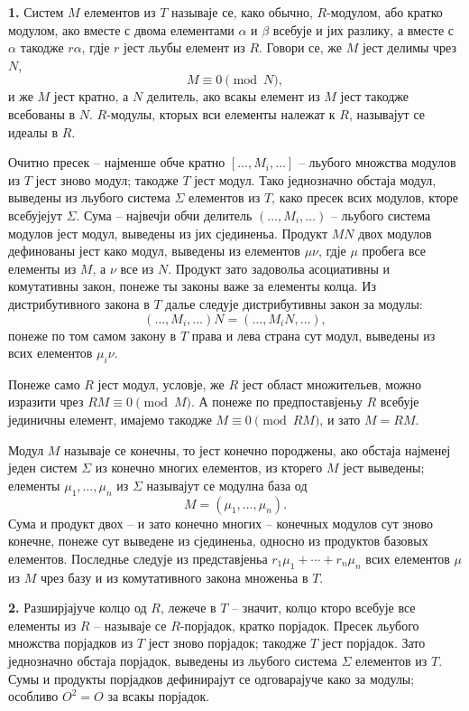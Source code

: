 ﻿\documentclass[11pt]{article}
\begin{document}
\textbf{1.} Систем $M$ елементов из $T$ называје се, како обычно, $R$-модулом, або кратко модулом, ако вместе с двома елементами $\alpha$ и $\beta$ всебује и јих разлику, а вместе с $\alpha$ такодже $r\alpha$, гдје $r$ јест льубы елемент из $R$. Говори се, же $M$ јест делимы чрез $N$,
\[
        M\equiv 0 \pmod N,
\]
и же $M$ јест кратно, а $N$ делитель, ако всакы елемент из $M$ јест такодже всебованы в $N$. $R$-модулы, кторых вси елементы належат к $R$, называјут се идеалы в $R$.

Очитно пресек -- најменше обче кратно $[\ldots,M_i,\ldots]$ -- льубого множства модулов из $T$ јест зново модул; такодже $T$ јест модул. Тако једнозначно обстаја модул, выведены из льубого система $\Sigma$ елементов из $T$, како пресек всих модулов, кторе всебујејут $\Sigma$. Сума -- највечји обчи делитель $(\ldots,M_i,\ldots)$ -- льубого система модулов јест модул, выведены из јих сјединеньа. Продукт $MN$ двох модулов дефинованы јест како модул, выведены из елементов $\mu\nu$, гдје $\mu$ пробега все елементы из $M$, а $\nu$ все из $N$. Продукт зато задовольа асоциативны и комутативны закон, понеже ты законы важе за елементы колца. Из дистрибутивного закона в $T$ далье следује дистрибутивны закон за модулы:
\[
        (\ldots,M_i,\ldots)N=(\ldots,M_iN,\ldots),
\]
понеже по том самом закону в $T$ права и лева страна сут модул, выведены из всих елементов $\mu_i\nu$.

Понеже само $R$ јест модул, условје, же $R$ јест област множительев, можно изразити чрез $RM\equiv0\pmod M$. А понеже по предпоставјеньу $R$ всебује јединичны елемент, имајемо такодже $M\equiv0\pmod{RM}$, и зато $M=RM$.

Модул $M$ называје се конечны, то јест конечно породжены, ако обстаја најменеј једен систем $\Sigma$ из конечно многих елементов, из кторего $M$ јест выведены; елементы $\mu_1,\ldots,\mu_n$ из $\Sigma$ называјут се модулна база од
\[
        M=(\mu_1,\ldots,\mu_n).
\]
Сума и продукт двох -- и зато конечно многих -- конечных модулов сут зново конечне, понеже сут выведене из сјединеньа, односно из продуктов базовых елементов. Последнье следује из представјеньа $r_1\mu_1+\cdots+r_n\mu_n$ всих елементов $\mu$ из $M$ чрез базу и из комутативного закона множеньа в $T$.

\textbf{2.} Разширјајуче колцо од $R$, лежече в $T$ -- значит, колцо кторо всебује все елементы из $R$ -- называје се $R$-порјадок, кратко порјадок. Пресек льубого множства порјадков из $T$ јест зново порјадок; такодже $T$ јест порјадок. Зато једнозначно обстаја порјадок, выведены из льубого система $\Sigma$ елементов из $T$. Сумы и продукты порјадков дефинирајут се одговарајуче како за модулы; особливо $O^2=O$ за всакы порјадок.
\end{document}

